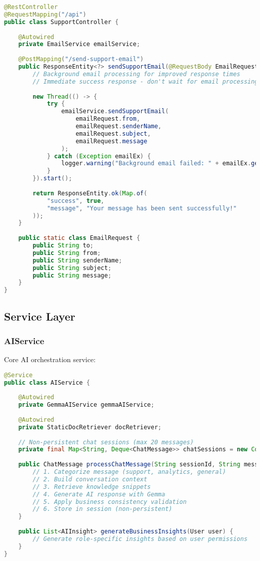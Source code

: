 \documentclass[11pt,a4paper]{article}
\begin{document}
\begin{lstlisting}[language=java, caption=Support Endpoints]
@RestController
@RequestMapping("/api")
public class SupportController {
    
    @Autowired
    private EmailService emailService;
    
    @PostMapping("/send-support-email")
    public ResponseEntity<?> sendSupportEmail(@RequestBody EmailRequest emailRequest) {
        // Background email processing for improved response times
        // Immediate success response - don't wait for email processing
        
        new Thread(() -> {
            try {
                emailService.sendSupportEmail(
                    emailRequest.from,
                    emailRequest.senderName,
                    emailRequest.subject,
                    emailRequest.message
                );
            } catch (Exception emailEx) {
                logger.warning("Background email failed: " + emailEx.getMessage());
            }
        }).start();
        
        return ResponseEntity.ok(Map.of(
            "success", true,
            "message", "Your message has been sent successfully!"
        ));
    }
    
    public static class EmailRequest {
        public String to;
        public String from;
        public String senderName;
        public String subject;
        public String message;
    }
}
\end{lstlisting}

\subsection{Service Layer}

\subsubsection{AIService}
Core AI orchestration service:

\begin{lstlisting}[language=java, caption=AI Service Implementation]
@Service
public class AIService {
    
    @Autowired
    private GemmaAIService gemmaAIService;
    
    @Autowired 
    private StaticDocRetriever docRetriever;
    
    // Non-persistent chat sessions (max 20 messages)
    private final Map<String, Deque<ChatMessage>> chatSessions = new ConcurrentHashMap<>();
    
    public ChatMessage processChatMessage(String sessionId, String message, User user) {
        // 1. Categorize message (support, analytics, general)
        // 2. Build conversation context 
        // 3. Retrieve knowledge snippets
        // 4. Generate AI response with Gemma
        // 5. Apply business consistency validation
        // 6. Store in session (non-persistent)
    }
    
    public List<AIInsight> generateBusinessInsights(User user) {
        // Generate role-specific insights based on user permissions
    }
}
\end{lstlisting}
\end{document}
